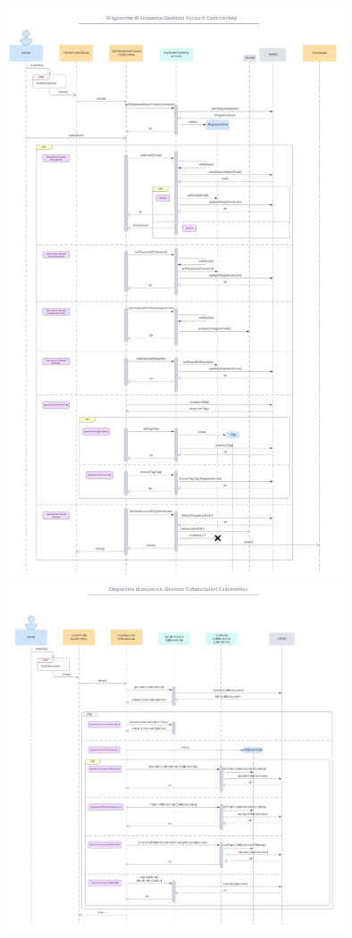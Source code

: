 \includegraphics[width=0.75\textwidth]{assets/img/sequenza_dettaglio/codemonkey-1.png}\\
\includegraphics[width=0.75\textwidth]{assets/img/sequenza_dettaglio/codemonkey-2.png}